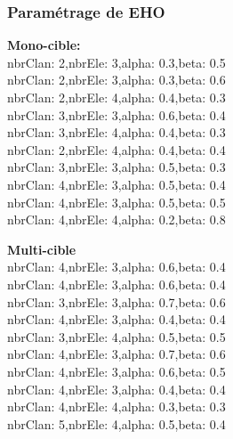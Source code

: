 \subsubsection{Paramétrage de EHO}
\noindent
\begin{minipage}[t]{0.55\textwidth}
	\textbf{Mono-cible:} \\
nbrClan: 2,nbrEle: 3,alpha: 0.3,beta: 0.5\\
nbrClan: 2,nbrEle: 3,alpha: 0.3,beta: 0.6\\
nbrClan: 2,nbrEle: 4,alpha: 0.4,beta: 0.3\\
nbrClan: 3,nbrEle: 3,alpha: 0.6,beta: 0.4\\
nbrClan: 3,nbrEle: 4,alpha: 0.4,beta: 0.3\\
nbrClan: 2,nbrEle: 4,alpha: 0.4,beta: 0.4\\
nbrClan: 3,nbrEle: 3,alpha: 0.5,beta: 0.3\\
nbrClan: 4,nbrEle: 3,alpha: 0.5,beta: 0.4\\
nbrClan: 4,nbrEle: 3,alpha: 0.5,beta: 0.5\\
nbrClan: 4,nbrEle: 4,alpha: 0.2,beta: 0.8

\end{minipage}\hfill
\hspace{0.2cm}
\begin{minipage}[t]{0.55\textwidth}
	\textbf{Multi-cible}\\
nbrClan: 4,nbrEle: 3,alpha: 0.6,beta: 0.4\\
nbrClan: 4,nbrEle: 3,alpha: 0.6,beta: 0.4\\
nbrClan: 3,nbrEle: 3,alpha: 0.7,beta: 0.6\\
nbrClan: 4,nbrEle: 3,alpha: 0.4,beta: 0.4\\
nbrClan: 3,nbrEle: 4,alpha: 0.5,beta: 0.5\\
nbrClan: 4,nbrEle: 3,alpha: 0.7,beta: 0.6\\
nbrClan: 4,nbrEle: 3,alpha: 0.6,beta: 0.5\\
nbrClan: 4,nbrEle: 3,alpha: 0.4,beta: 0.4\\
nbrClan: 4,nbrEle: 4,alpha: 0.3,beta: 0.3\\
nbrClan: 5,nbrEle: 4,alpha: 0.5,beta: 0.4
	
\end{minipage}\hfill


